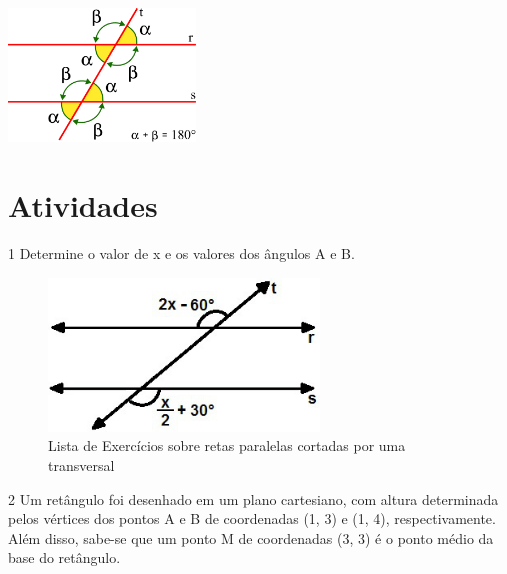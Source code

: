 \begin{escolha}
\begin{escolha}
\begin{escolha}
\begin{escolha}
{\begin{itemize}
\includegraphics[width=1.96354in,height=1.3968in]{./_SAEB_9_MAT/media/image186.png}

\end{itemize}


\section{Atividades}

\num{1} Determine o valor de x e os valores dos ângulos A e B.

\begin{figure}
\centering
\includegraphics[width=2.83333in,height=1.60939in]{./_SAEB_9_MAT/media/image187.jpeg}
\caption{Lista de Exercícios sobre retas paralelas cortadas por uma
transversal}
\end{figure}


\begin{boxmedio}


\num{2} Um retângulo foi desenhado em um plano cartesiano, com altura
determinada pelos vértices dos pontos A e B de coordenadas (1, 3) e (1,
4), respectivamente. Além disso, sabe-se que um ponto M de
coordenadas (3, 3) é o ponto médio da base do retângulo.


\end{boxmedio}}
\end{escolha}
\end{escolha}
\end{escolha}
\end{escolha}
